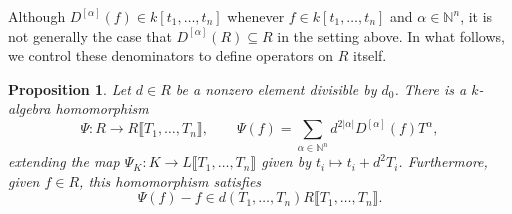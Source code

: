 \documentclass[11pt,leqno]{amsart}
\numberwithin{equation}{section}
\newtheorem{proposition}[theorem]{Proposition}
\theoremstyle{definition}
\theoremstyle{remark}
\newcommand{\N}{\mathbb{N}}
\newcommand{\llb}{\llbracket}
\newcommand{\rrb}{\rrbracket}
\begin{document}
Although $D^{[\alpha]}(f) \in k[t_1, \dots, t_n]$ whenever $f \in k[t_1, \dots, t_n]$ and $\alpha \in \N^n$, it is not generally the case that $D^{[\alpha]}(R) \subseteq R$ in the setting above. In what follows, we control these denominators to define operators on $R$ itself. 



\begin{proposition} \label{lem: Psi}
Let $d \in R$ be a nonzero element divisible by $d_0$. There is a $k$-algebra homomorphism $$\Psi: R \longrightarrow R\llb T_1, \dots, T_n \rrb, \qquad \Psi(f) = \sum_{\alpha \in \N^n} d^{2|\alpha|}D^{[\alpha]}(f) T^\alpha,$$ extending the map $\Psi_K: K \longrightarrow L\llb T_1, \dots, T_n \rrb$ given by $t_i \mapsto t_i + d^2T_i$. Furthermore, given $f \in R$, this homomorphism satisfies $$\Psi(f) - f \in d(T_1, \dots, T_n)R\llb T_1, \dots, T_n\rrb.$$
\end{proposition}
\end{document}

